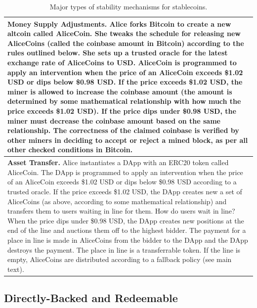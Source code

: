 \begin{table}[t!]
\begin{tabular}{|l|}
\multicolumn{1}{|p{\textwidth}|}{\textbf{Money Supply Adjustments.} \newline \footnotesize Alice forks Bitcoin to create a new altcoin called AliceCoin. She tweaks the schedule for releasing new AliceCoins (called the coinbase amount in Bitcoin) according to the rules outlined below. She sets up a trusted oracle for the latest exchange rate of AliceCoins to USD. AliceCoin is programmed to apply an intervention when the price of an AliceCoin exceeds \$1.02 USD or dips below \$0.98 USD. If the price exceeds \$1.02 USD, the miner is allowed to increase the coinbase amount (the amount is determined by some mathematical relationship with how much the price exceeds \$1.02 USD). If the price dips under \$0.98 USD, the miner must decrease the coinbase amount based on the same relationship. The correctness of the claimed coinbase is verified by other miners in deciding to accept or reject a mined block, as per all other checked conditions in Bitcoin.} \\ \hline

\multicolumn{1}{|p{\textwidth}|}{\textbf{Asset Transfer.} \newline \footnotesize Alice instantiates a DApp with an ERC20 token called AliceCoin. The DApp is programmed to apply an intervention when the price of an AliceCoin exceeds \$1.02 USD or dips below \$0.98 USD according to a trusted oracle. If the price exceeds \$1.02 USD, the DApp creates new a set of AliceCoins (as above, according to some mathematical relationship) and transfers them to users waiting in line for them. How do users wait in line? When the price dips under \$0.98 USD, the DApp creates new positions at the end of the line and auctions them off to the highest bidder. The payment for a place in line is made in AliceCoins from the bidder to the DApp and the DApp destroys the payment. The place in line is a transferrable token. If the line is empty, AliceCoins are distributed according to a fallback policy (see main text).} \\ \hline

\end{tabular}
\caption{Major types of stability mechanisms for stablecoins.\label{tab:mech}}
\end{table}


\subsection{Directly-Backed and Redeemable}
\label{sec:redeem}


